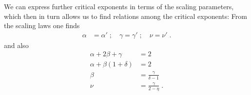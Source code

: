 We can express further critical exponents in terms of the scaling parameters, which then in turn allows us to find relations among the 
critical exponents:
%
From the scaling laws one finds
\begin{align}
\alpha&=\alpha'\;;\quad
\gamma=\gamma'\;;\quad\nu=\nu'\;.
\end{align}
%
and also
%
\begin{align}
\alpha+2\beta+\gamma &=2\\
\alpha+\beta (1+\delta)&=2\\
\beta &=\frac{\gamma}{\delta-1}\\
\nu &=\frac{\gamma}{2-\eta}\;.
\end{align}
%

